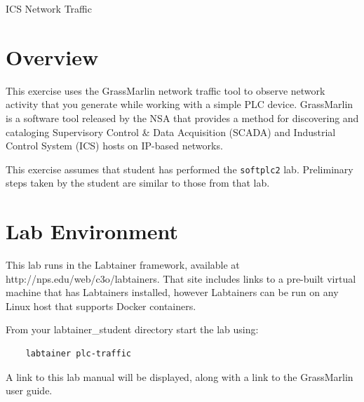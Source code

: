 


\begin{center}
{\LARGE ICS Network Traffic}
\vspace{0.1in}\\
\end{center}


\section{Overview}
This exercise uses the GrassMarlin network traffic tool to
observe network activity that you generate while working
with a simple PLC device.  
GrassMarlin is a software tool released by the NSA that provides a method for discovering and cataloging
Supervisory Control \& Data Acquisition (SCADA) and Industrial Control System (ICS) hosts on IP-based
networks.  

This exercise assumes that student has performed the {\tt softplc2} lab.
Preliminary steps taken by the student are similar to those from that lab.

\section{Lab Environment}
This lab runs in the Labtainer framework,
available at http://nps.edu/web/c3o/labtainers.
That site includes links to a pre-built virtual machine
that has Labtainers installed, however Labtainers can
be run on any Linux host that supports Docker containers.

From your labtainer_student directory start the lab using:
\begin{verbatim}
    labtainer plc-traffic
\end{verbatim}
A link to this lab manual will be displayed, along with a link to the GrassMarlin 
user guide.

